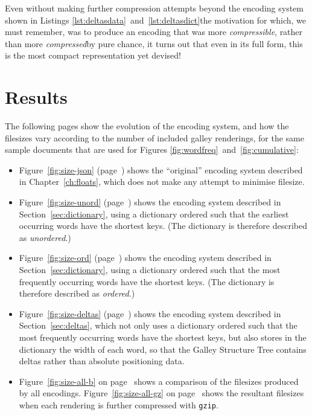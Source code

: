 Even without making further compression attempts beyond the encoding system shown in Listings \ref{lst:deltasdata}~and~\ref{lst:deltasdict}\ed the motivation for which, we must remember, was to produce an encoding that was more \emph{compressible}, rather than more \emph{compressed}\ed by pure chance, it turns out that even in its full form, this is the most compact representation yet devised!



\newpage
\section{Results}

The following pages show the evolution of the encoding system, and how the filesizes vary according to the number of included galley renderings, for the same sample documents that are used for Figures \ref{fig:wordfreq}~and~\ref{fig:cumulative}:

\begin{itemize}

 \item Figure~\ref{fig:size-json} (page~\pageref{fig:size-json}) shows the ``original'' encoding system described in Chapter~\ref{ch:floats}, which does not make any attempt to minimise filesize.

 \item Figure~\ref{fig:size-unord} (page~\pageref{fig:size-unord}) shows the encoding system described in Section~\ref{sec:dictionary}, using a dictionary ordered such that the earliest occurring words have the shortest keys. (The dictionary is therefore described as \emph{unordered}.)

 \item Figure~\ref{fig:size-ord} (page~\pageref{fig:size-ord}) shows the encoding system described in Section~\ref{sec:dictionary}, using a dictionary ordered such that the most frequently occurring words have the shortest keys. (The dictionary is therefore described as \emph{ordered}.)

 \item Figure~\ref{fig:size-deltas} (page~\pageref{fig:size-deltas}) shows the encoding system described in Section~\ref{sec:deltas}, which not only uses a dictionary ordered such that the most frequently occurring words have the shortest keys, but also stores in the dictionary the width of each word, so that the Galley Structure Tree contains deltas rather than absolute positioning data.
 
 \item Figure~\ref{fig:size-all-b} on page~\pageref{fig:size-all-b} shows a comparison of the filesizes produced by all encodings. Figure~\ref{fig:size-all-gz} on page~\pageref{fig:size-all-gz} shows the resultant filesizes when each rendering is further compressed with \texttt{gzip}.
\end{itemize}



